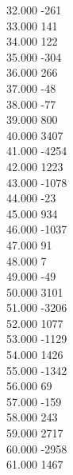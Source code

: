 { 32.000	-261 \\
 33.000	141 \\
 34.000	122 \\
 35.000	-304 \\
 36.000	266 \\
 37.000	-48 \\
 38.000	-77 \\
 39.000	800 \\
 40.000	3407 \\
 41.000	-4254 \\
 42.000	1223 \\
 43.000	-1078 \\
 44.000	-23 \\
 45.000	934 \\
 46.000	-1037 \\
 47.000	91 \\
 48.000	7 \\
 49.000	-49 \\
 50.000	3101 \\
 51.000	-3206 \\
 52.000	1077 \\
 53.000	-1129 \\
 54.000	1426 \\
 55.000	-1342 \\
 56.000	69 \\
 57.000	-159 \\
 58.000	243 \\
 59.000	2717 \\
 60.000	-2958 \\
 61.000	1467 \\
}
